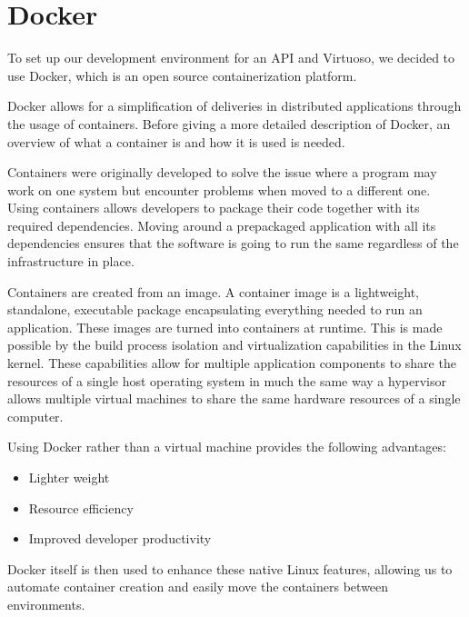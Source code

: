\section{Docker}
To set up our development environment for an API and Virtuoso, we decided to use Docker, which is an open source containerization platform.

Docker allows for a simplification of deliveries in distributed applications through the usage of containers\cite{Container_Docker}. 
Before giving a more detailed description of Docker, an overview of what a container is and how it is used is needed. 


Containers were originally developed to solve the issue where a program may work on one system but encounter problems when moved to a different one. 
Using containers allows developers to package their code together with its required dependencies. 
Moving around a prepackaged application with all its dependencies ensures that the software is going to run the same regardless of the infrastructure in place\cite{Container_Docker}.

Containers are created from an image. A container image is a lightweight, standalone, executable package encapsulating everything needed to run an application. 
These images are turned into containers at runtime.
This is made possible by the build process isolation and virtualization capabilities in the Linux kernel. 
These capabilities allow for multiple application components to share the resources of a single host operating system in much the same way a hypervisor allows multiple virtual machines to share the same hardware resources of a single computer\cite{Container_Docker}.


Using Docker rather than a virtual machine provides the following advantages:

\begin{itemize}
    \item Lighter weight
    \item Resource efficiency
    \item Improved developer productivity
\end{itemize}

Docker itself is then used to enhance these native Linux features, allowing us to automate container creation and easily move the containers between environments\cite{Docker_IBM}.